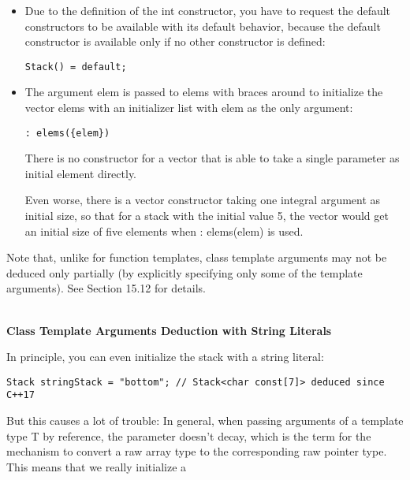 \begin{itemize}
\item 
Due to the definition of the int constructor, you have to request the default constructors to be available with its default behavior, because the default constructor is available only if no other constructor is defined:
\begin{lstlisting}[style=styleCXX]
Stack() = default;
\end{lstlisting}

\item 
The argument elem is passed to elems with braces around to initialize the vector elems with an initializer list with elem as the only argument:
\begin{lstlisting}[style=styleCXX]
: elems({elem})
\end{lstlisting}
There is no constructor for a vector that is able to take a single parameter as initial element directly.

\begin{tcolorbox}[colback=webgreen!5!white,colframe=webgreen!75!black]
\hspace*{0.75cm}Even worse, there is a vector constructor taking one integral argument as initial size, so that for a stack with the initial value 5, the vector would get an initial size of five elements when : elems(elem) is used.
\end{tcolorbox}

\end{itemize}

Note that, unlike for function templates, class template arguments may not be deduced only partially (by explicitly specifying only some of the template arguments). See Section 15.12 for details.

\hspace*{\fill} \\ %
\noindent
\textbf{Class Template Arguments Deduction with String Literals}

In principle, you can even initialize the stack with a string literal:

\begin{lstlisting}[style=styleCXX]
Stack stringStack = "bottom"; // Stack<char const[7]> deduced since C++17
\end{lstlisting}

But this causes a lot of trouble: In general, when passing arguments of a template type T by reference, the parameter doesn’t decay, which is the term for the mechanism to convert a raw array type to the corresponding raw pointer type. This means that we really initialize a

